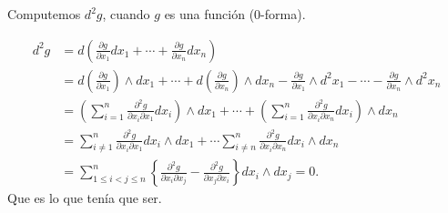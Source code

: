 \begin{subappendices}
\begin{ejemplo} Computemos $d^2g$, cuando $g$ es una función (0-forma).

\[
\begin{split}
d^2g&=d\left(\frac{\partial g}{\partial x_1}dx_1+\cdots+\frac{\partial g}{\partial x_n}dx_n\right)\\
&= d\left(\frac{\partial g}{\partial x_1}\right)\wedge dx_1+\cdots+d\left(\frac{\partial g}{\partial x_n}\right)\wedge dx_n
    -\frac{\partial g}{\partial x_1}\wedge d^2x_1-\cdots-\frac{\partial g}{\partial x_n}\wedge d^2x_n\\
    &=\left(\sum_{i=1}^n\frac{\partial^2g}{\partial x_i\partial x_1} dx_i\right)\wedge dx_1+\cdots+\left(\sum_{i=1}^n\frac{\partial^2g}{\partial x_i\partial x_n} dx_i\right)\wedge dx_n\\
    &= \sum_{i\neq 1}^n\frac{\partial^2g}{\partial x_i\partial x_1} dx_i\wedge dx_1+\cdots
    \sum_{i\neq n}^n\frac{\partial^2g}{\partial x_i\partial x_n} dx_i\wedge dx_n\\
    &=\sum_{1\leq i<j\leq n}^n\left\{\frac{\partial^2g}{\partial x_i\partial x_j}- \frac{\partial^2g}{\partial x_j\partial x_i}\right \} dx_i\wedge dx_j=0.
\end{split}
\]
Que es lo que tenía que ser.


\end{ejemplo}



\end{subappendices}
\nocite{*}
  
  


%

